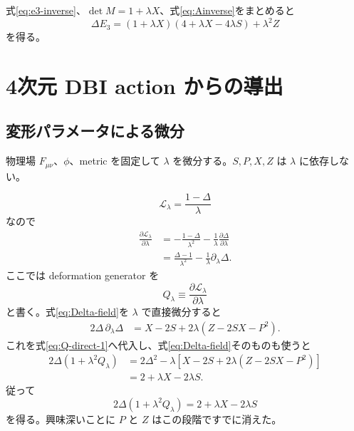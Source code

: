 \documentclass[a4paper,11pt]{ltjsreport}
\newcommand{\Lag}{\mathcal L}
\begin{document}
式\eqref{eq:e3-inverse}、$\det M=1+\lambda X$、式\eqref{eq:Ainverse}をまとめると
\begin{equation}
 \Delta E_3
 =(1+\lambda X)(4+\lambda X-4\lambda S)+\lambda^2Z
 \label{eq:E3-field}
\end{equation}
を得る。

\chapter{4次元 DBI action からの導出}

\section{変形パラメータによる微分}

物理場 $F_{\mu\nu}$、$\phi$、metric を固定して $\lambda$ を微分する。$S,P,X,Z$ は $\lambda$ に依存しない。

\begin{equation}
 \Lag_\lambda=\frac{1-\Delta}{\lambda}
\end{equation}
なので
\begin{align}
 \frac{\partial\Lag_\lambda}{\partial\lambda}
 &=-\frac{1-\Delta}{\lambda^2}-\frac{1}{\lambda}\frac{\partial\Delta}{\partial\lambda}\\
 &=\frac{\Delta-1}{\lambda^2}-\frac1\lambda\partial_\lambda\Delta.
 \label{eq:Q-direct-1}
\end{align}
ここでは deformation generator を
\begin{equation}
 Q_\lambda\equiv\frac{\partial\Lag_\lambda}{\partial\lambda}
 \label{eq:Ydef-note}
\end{equation}
と書く。式\eqref{eq:Delta-field}を $\lambda$ で直接微分すると
\begin{align}
 2\Delta\,\partial_\lambda\Delta
 &=X-2S+2\lambda\left(Z-2SX-P^2\right).
 \label{eq:Delta-derivative-note}
\end{align}
これを式\eqref{eq:Q-direct-1}へ代入し、式\eqref{eq:Delta-field}そのものも使うと
\begin{align}
 2\Delta(1+\lambda^2Q_\lambda)
 &=2\Delta^2
 -\lambda\left[X-2S+2\lambda(Z-2SX-P^2)\right]\\
 &=2+\lambda X-2\lambda S.
\end{align}
従って
\begin{equation}
 2\Delta(1+\lambda^2Q_\lambda)
 =2+\lambda X-2\lambda S
 \label{eq:Q-field-simple}
\end{equation}
を得る。興味深いことに $P$ と $Z$ はこの段階ですでに消えた。
\end{document}

